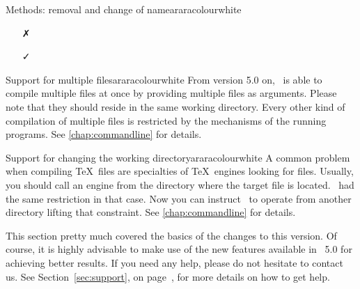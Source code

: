 \begin{messagebox}{Methods: removal and change of name}{araracolour}{\icinfo}{white}
\begin{itemize}
\vspace{1em}

\item[\textcolor{warningcolour}{\faClose}] 

\vspace{.5em}

\hspace{2cm}\textcolor{teal}{\faArrowDown}

\item[\textcolor{okcolour}{\faCheck}]
\end{itemize}
\end{messagebox}

\begin{messagebox}{Support for multiple files}{araracolour}{\icinfo}{white}
From version 5.0 on, \arara\ is able to compile multiple files at once by providing multiple files as arguments. Please note that they should reside in the same working directory. Every other kind of compilation of multiple files is restricted by the mechanisms of the running programs. See \autoref{chap:commandline} for details.
\end{messagebox}

\begin{messagebox}{Support for changing the working directory}{araracolour}{\icinfo}{white}
A common problem when compiling \TeX\ files are specialties of \TeX\ engines looking for files. Usually, you should call an engine from the directory where the target file is located. \arara\ had the same restriction in that case. Now you can instruct \arara\ to operate from another directory lifting that constraint. See \autoref{chap:commandline} for details.
\end{messagebox}

This section pretty much covered the basics of the changes to this version. Of course, it is highly advisable to make use of the new features available in \arara\ 5.0 for achieving better results. If you need any help, please do not hesitate to contact us. See Section~\ref{sec:support}, on page~\pageref{sec:support}, for more details on how to get help.
